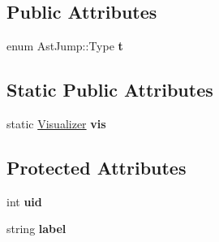 \subsection*{Public Attributes}
\begin{DoxyCompactItemize}
\item 
\hypertarget{classAstJump_aea1a550743aa9b9a0e73de3d5489cdfd}{enum Ast\-Jump\-::\-Type {\bfseries t}}\label{classAstJump_aea1a550743aa9b9a0e73de3d5489cdfd}

\end{DoxyCompactItemize}
\subsection*{Static Public Attributes}
\begin{DoxyCompactItemize}
\item 
\hypertarget{classAST_aca9e6637209b31e03a09c0d42f29bdfa}{static \hyperlink{classVisualizer}{Visualizer} {\bfseries vis}}\label{classAST_aca9e6637209b31e03a09c0d42f29bdfa}

\end{DoxyCompactItemize}
\subsection*{Protected Attributes}
\begin{DoxyCompactItemize}
\item 
\hypertarget{classAST_a847b778f1c3dd5a19de32de432ee6e15}{int {\bfseries uid}}\label{classAST_a847b778f1c3dd5a19de32de432ee6e15}

\item 
\hypertarget{classAST_ab2e239ccc0688d2341724432ff5a1a31}{string {\bfseries label}}\label{classAST_ab2e239ccc0688d2341724432ff5a1a31}

\end{DoxyCompactItemize}
